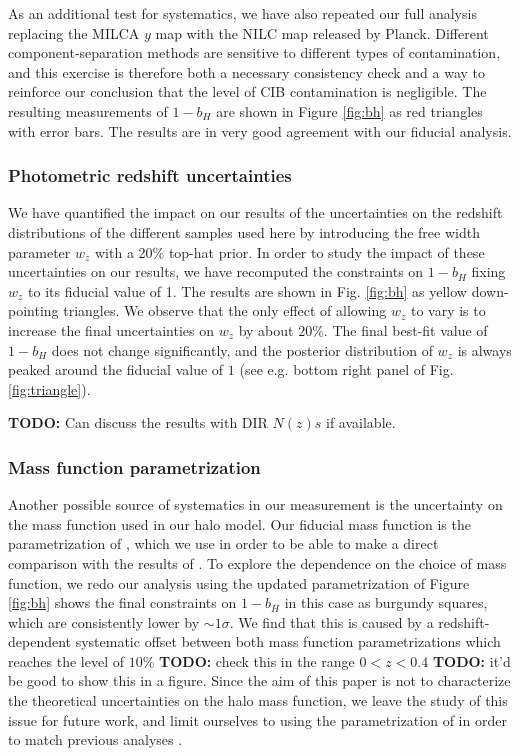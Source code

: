 \documentclass[useAMS,usenatbib]{mn2e}
\newcommand{\todo}[1]{{\bf TODO:} #1}
\begin{document}
      As an additional test for systematics, we have also repeated our full analysis replacing the MILCA $y$ map with the NILC map released by Planck. Different component-separation methods are sensitive to different types of contamination, and this exercise is therefore both a necessary consistency check and a way to reinforce our conclusion that the level of CIB contamination is negligible. The resulting measurements of $1-b_H$ are shown in Figure \ref{fig:bh} as red triangles with error bars. The results are in very good agreement with our fiducial analysis.

    \subsubsection{Photometric redshift uncertainties}\label{sssec:results.syst.pz}
      We have quantified the impact on our results of the uncertainties on the redshift distributions of the different samples used here by introducing the free width parameter $w_z$ with a 20\% top-hat prior. In order to study the impact of these uncertainties on our results, we have recomputed the constraints on $1-b_H$ fixing $w_z$ to its fiducial value of 1. The results are shown in Fig. \ref{fig:bh} as yellow down-pointing triangles. We observe that the only effect of allowing $w_z$ to vary is to increase the final uncertainties on $w_z$ by about $20\%$. The final best-fit value of $1-b_H$ does not change significantly, and the posterior distribution of $w_z$ is always peaked around the fiducial value of $1$ (see e.g. bottom right panel of Fig. \ref{fig:triangle}).
      
      \todo{Can discuss the results with DIR $N(z)s$ if available.}
    
    \subsubsection{Mass function parametrization}\label{sssec:results.syst.mf}
      Another possible source of systematics in our measurement is the uncertainty on the mass function used in our halo model. Our fiducial mass function is the parametrization of \citep{2008ApJ...688..709T}, which we use in order to be able to make a direct comparison with the results of \cite{2016A&A...594A..24P}. To explore the dependence on the choice of mass function, we redo our analysis using the updated parametrization of \citep{2010ApJ...724..878T} Figure \ref{fig:bh} shows the final constraints on $1-b_H$ in this case as burgundy squares, which are consistently lower by $\sim 1\sigma$. We find that this is caused by a redshift-dependent systematic offset between both mass function parametrizations which reaches the level of $10\%$ \todo{check this} in the range $0<z<0.4$ \todo{it'd be good to show this in a figure}. Since the aim of this paper is not to characterize the theoretical uncertainties on the halo mass function, we leave the study of this issue for future work, and limit ourselves to using the parametrization of \citep{2008ApJ...688..709T} in order to match previous analyses \citep[e.g.][]{2016A&A...594A..24P,2018MNRAS.477.4957B,2018MNRAS.473.4318A,2019arXiv190407887Z,2019arXiv190707870M}.
\end{document}
